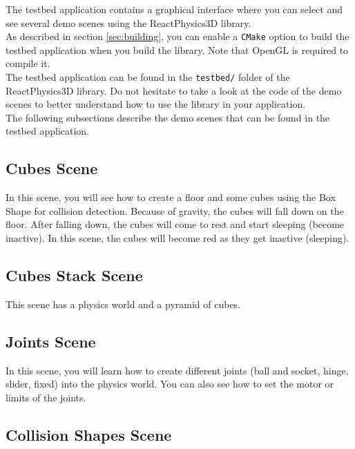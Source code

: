 \documentclass[a4paper,12pt]{article}
\begin{document}
    The testbed application contains a graphical interface where you can select and see several demo scenes using the ReactPhysics3D library. \\

    As described in section \ref{sec:building}, you can enable a \texttt{CMake} option to build the testbed application when you build the library.
    Note that OpenGL is required to compile it. \\

    The testbed application can be found in the \texttt{testbed/} folder of
    the ReactPhysics3D library. Do not hesitate to take a look at the code of the demo scenes to better understand how
    to use the library in your application. \\

    The following subsections describe the demo scenes that can be found in the testbed application.

    \subsection{Cubes Scene}

    In this scene, you will see how to create a floor and some cubes using the Box Shape for collision detection. Because of gravity,
    the cubes will fall down on the floor. After falling down, the cubes will come to rest and start sleeping (become inactive). In this scene,
    the cubes will become red as they get inactive (sleeping).

   \subsection{Cubes Stack Scene}

    This scene has a physics world and a pyramid of cubes.

    \subsection{Joints Scene}

    In this scene, you will learn how to create different joints (ball and socket, hinge, slider, fixed) into the physics world. You can also see how
    to set the motor or limits of the joints.

    \subsection{Collision Shapes Scene}
\end{document}
